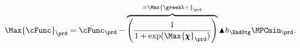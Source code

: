  \begin{equation}\begin{gathered}\begin{aligned}
        \Max{\cFunc}_{\prd}  & = \bar{\cFunc}_{\prd}-\overbrace{\left(\frac{1}{1+\exp(\Max{\chiFunc}_{\prd})}\right)}^{=\Max{\koppa}_{\prd}} \aboveMin \hNrm_{\EndStg} \MPCmin_{\prd}. \label{eq:cFuncHi}
      \end{aligned}\end{gathered}\end{equation}
